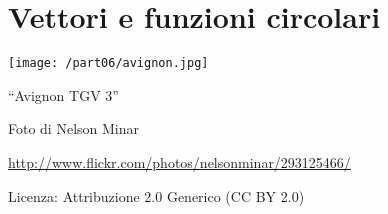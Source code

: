 \part{Vettori e funzioni circolari}
\texttt{[image: /part06/avignon.jpg]}
  \begin{center}
    {\large ``Avignon TGV 3''}\par
    Foto di Nelson Minar\par
    \url{http://www.flickr.com/photos/nelsonminar/293125466/}\par
    Licenza: Attribuzione 2.0 Generico (CC BY 2.0)\par
  \end{center}
\clearpage
\cleardoublepage
